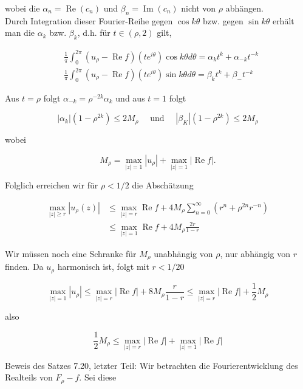 \documentclass[10pt, letterpaper]{article}
\begin{document}
wobei die $\alpha_{n}=\operatorname{Re}\left(c_{n}\right)$ und $\beta_{n}=\operatorname{Im}\left(c_{n}\right)$ nicht von $\rho$ abhängen.\\
Durch Integration dieser Fourier-Reihe gegen $\cos k \theta$ bzw. gegen $\sin k \theta$ erhält man die $\alpha_{k}$ bzw. $\beta_{k}$, d.h. für $t \in(\rho, 2)$ gilt,

$$
\begin{aligned}
& \frac{1}{\pi} \int_{0}^{2 \pi}\left(u_{\rho}-\operatorname{Re} f\right)\left(t e^{i \theta}\right) \cos k \theta d \theta=\alpha_{k} t^{k}+\alpha_{-k} t^{-k} \\
& \frac{1}{\pi} \int_{0}^{2 \pi}\left(u_{\rho}-\operatorname{Re} f\right)\left(t e^{i \theta}\right) \sin k \theta d \theta=\beta_{k} t^{k}+\beta_{-} t^{-k}
\end{aligned}
$$

Aus $t=\rho$ folgt $\alpha_{-k}=\rho^{-2 k} \alpha_{k}$ und aus $t=1$ folgt

$$
\left|\alpha_{k}\right|\left(1-\rho^{2 k}\right) \leqslant 2 M_{\rho} \quad \text { und } \quad\left|\beta_{K}\right|\left(1-\rho^{2 k}\right) \leqslant 2 M_{\rho}
$$

wobei

$$
M_{\rho}=\max _{|z|=1}\left|u_{\rho}\right|+\max _{|z|=1}|\operatorname{Re} f| .
$$

Folglich erreichen wir für $\rho<1 / 2$ die Abschätzung

$$
\begin{aligned}
\max _{|z| \geqslant r}\left|u_{\rho}(z)\right| & \leqslant \max _{|z|=r} \operatorname{Re} f+4 M_{\rho} \sum_{n=0}^{\infty}\left(r^{n}+\rho^{2 n} r^{-n}\right) \\
& \leqslant \max _{|z|=1} \operatorname{Re} f+4 M_{\rho} \frac{2 r}{1-r}
\end{aligned}
$$

Wir müssen noch eine Schranke für $M_{\rho}$ unabhängig von $\rho$, nur abhängig von $r$ finden. Da $u_{\rho}$ harmonisch ist, folgt mit $r<1 / 20$

$$
\max _{|z|=1}\left|u_{\rho}\right| \leqslant \max _{|z|=r}|\operatorname{Re} f|+8 M_{\rho} \frac{r}{1-r} \leqslant \max _{|z|=r}|\operatorname{Re} f|+\frac{1}{2} M_{\rho}
$$

also

$$
\frac{1}{2} M_{\rho} \leqslant \max _{|z|=r}|\operatorname{Re} f|+\max _{|z|=1}|\operatorname{Re} f|
$$

Beweis des Satzes 7.20, letzter Teil: Wir betrachten die Fourierentwicklung des Realteils von $F_{\rho}-f$. Sei diese
\end{document}
